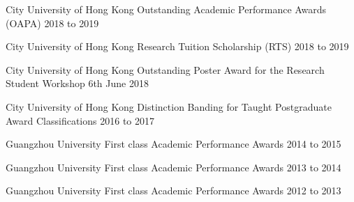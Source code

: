 
\begin{cventries}
  \cventry
    {City University of Hong Kong} %
    {Outstanding Academic Performance Awards (OAPA)}{} %
    {2018 to 2019}{}
\end{cventries}

\begin{cventries}
  \cventry
    {City University of Hong Kong} %
    {Research Tuition Scholarship (RTS)}{} %
    {2018 to 2019}{}
\end{cventries}

\begin{cventries}
  \cventry
    {City University of Hong Kong} %
    {Outstanding Poster Award for the Research Student Workshop}{}
    {6th June 2018}{}
\end{cventries}


\begin{cventries}
  \cventry
    {City University of Hong Kong} %
    {Distinction Banding for Taught Postgraduate Award Classifications}{} %
    {2016 to 2017}{}
\end{cventries}

\begin{cventries}
  \cventry
    {Guangzhou University} %
    {First class Academic Performance Awards}{} %
    {2014 to 2015}{}
\end{cventries}

\begin{cventries}
  \cventry
    {Guangzhou University} %
    {First class Academic Performance Awards}{} %
    {2013 to 2014}{}
\end{cventries}

\begin{cventries}
  \cventry
    {Guangzhou University} %
    {First class Academic Performance Awards}{} %
    {2012 to 2013}{}
\end{cventries}